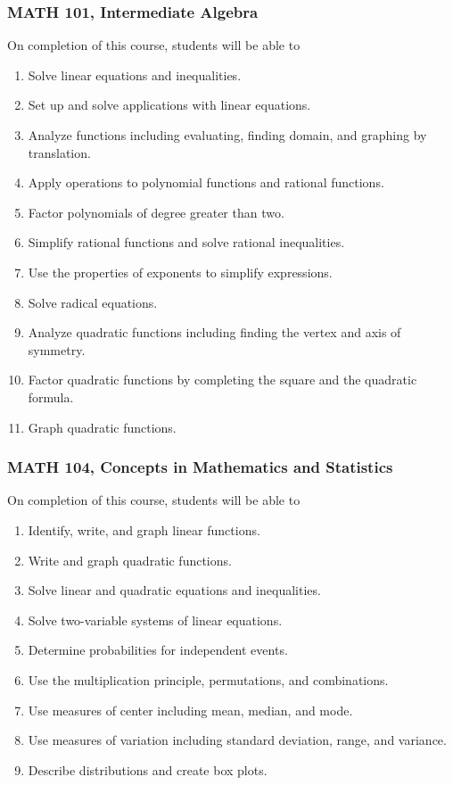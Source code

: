 \documentclass[11pt]{article}
\newenvironment{alphalist}{
\begin{enumerate}[label=(\arabic*),widest=107 ,leftmargin=25pt, itemsep=0pt]}
{\end{enumerate}}
\begin{document}
\subsubsection{MATH 101, Intermediate Algebra}

On completion of this course, students will  be able to 
\begin{alphalist}
\item  Solve linear equations and inequalities.
\item  Set up and solve applications with linear equations.
\item  Analyze functions including evaluating, finding domain, and graphing by translation.
\item  Apply operations to polynomial functions and rational functions.
\item  Factor polynomials of degree greater than two.
\item  Simplify rational functions and solve rational inequalities.
\item  Use the properties of exponents to simplify expressions.
\item  Solve radical equations.
\item  Analyze quadratic functions including finding the vertex and axis of symmetry.
\item Factor quadratic functions by completing the square and the quadratic formula.
\item  Graph quadratic functions.
\end{alphalist}
\subsubsection{MATH 104, Concepts in Mathematics and Statistics}


On completion of this course, students will be able to
\begin{alphalist}
    \item Identify, write, and graph linear functions.
    \item Write and graph quadratic functions.
    \item Solve linear and quadratic equations and inequalities.
    \item Solve two-variable systems of linear equations.
    \item Determine probabilities for independent events.
    \item Use the multiplication principle, permutations, and combinations.
    \item Use measures of center including mean, median, and mode.
    \item Use measures of variation including standard deviation, range, and variance.
    \item Describe distributions and create box plots.
\end{alphalist}
\end{document}
